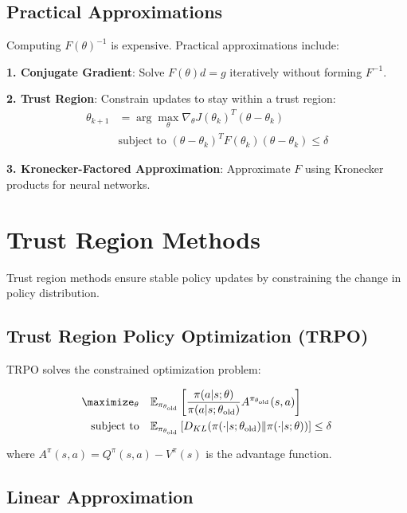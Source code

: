 \subsection{Practical Approximations}

Computing $F(\theta)^{-1}$ is expensive. Practical approximations include:

\textbf{1. Conjugate Gradient}: Solve $F(\theta) d = g$ iteratively without forming $F^{-1}$.

\textbf{2. Trust Region}: Constrain updates to stay within a trust region:
\begin{align}
\theta_{k+1} &= \arg\max_\theta \nabla_\theta J(\theta_k)^T (\theta - \theta_k) \\
&\text{subject to } (\theta - \theta_k)^T F(\theta_k) (\theta - \theta_k) \leq \delta
\end{align}

\textbf{3. Kronecker-Factored Approximation}: Approximate $F$ using Kronecker products for neural networks.

\section{Trust Region Methods}

Trust region methods ensure stable policy updates by constraining the change in policy distribution.

\subsection{Trust Region Policy Optimization (TRPO)}

TRPO solves the constrained optimization problem:

\begin{align}
\maximize_\theta \quad & \mathbb{E}_{\pi_{\theta_{\text{old}}}} \left[ \frac{\pi(a|s; \theta)}{\pi(a|s; \theta_{\text{old}})} A^{\pi_{\theta_{\text{old}}}}(s,a) \right] \\
\text{subject to} \quad & \mathbb{E}_{\pi_{\theta_{\text{old}}}} \left[ D_{KL}(\pi(\cdot|s; \theta_{\text{old}}) \| \pi(\cdot|s; \theta)) \right] \leq \delta
\end{align}

where $A^\pi(s,a) = Q^\pi(s,a) - V^\pi(s)$ is the advantage function.

\subsection{Linear Approximation}

